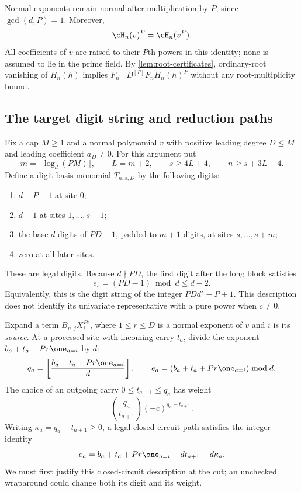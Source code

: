 Normal exponents remain normal after multiplication by $P$,
since $\gcd(d,P)=1$. Moreover,
\begin{equation}
 \cH_n(v)^P=\cH_n(v^P).
 \label{eq:frobenius-trace}
\end{equation}
All coefficients of $v$ are raised to their $P$th powers in
this identity; none is assumed to lie in the prime field.
By \cref{lem:root-certificates}, ordinary-root vanishing of
$H_n(h)$ implies
$F_n\mid D^{[P]}F_nH_n(h)^P$ without any root-multiplicity bound.

\subsection{The target digit string and reduction paths}

Fix a cap $M\ge1$ and a normal polynomial $v$ with positive
leading degree $D\le M$ and leading coefficient $a_D\ne0$.
For this argument put
\begin{equation}
 m=\lfloor\log_d(PM)\rfloor,\qquad L=m+2,
 \qquad s\ge4L+4,\qquad n\ge s+3L+4.
 \label{eq:hasse-spacing}
\end{equation}
Define a digit-basis monomial $T_{n,s,D}$ by the following digits:
\begin{enumerate}[label=\textup{(\alph*)}]
 \item $d-P+1$ at site $0$;
 \item $d-1$ at sites $1,\ldots,s-1$;
 \item the base-$d$ digits of $PD-1$, padded to $m+1$ digits,
       at sites $s,\ldots,s+m$;
 \item zero at all later sites.
\end{enumerate}
These are legal digits. Because $d\nmid PD$, the first digit
after the long block satisfies
\begin{equation}
 e_s=(PD-1)\bmod d\le d-2.
 \label{eq:first-small-digit}
\end{equation}
Equivalently, this is the digit string of the integer
$PDd^s-P+1$. This description does not identify its univariate
representative with a pure power when $c\ne0$.

Expand a term $B_{n,j}X_i^{Pr}$, where $1\le r\le D$ is
a normal exponent of $v$ and $i$ is its \emph{source}. At a
processed site with incoming carry $t_a$, divide the exponent
$b_a+t_a+Pr\one_{a=i}$ by $d$:
\[
 q_a=\left\lfloor\frac{b_a+t_a+Pr\one_{a=i}}d\right\rfloor,
 \qquad e_a=(b_a+t_a+Pr\one_{a=i})\bmod d.
\]
The choice of an outgoing carry $0\le t_{a+1}\le q_a$ has weight
\begin{equation}
 \binom{q_a}{t_{a+1}}(-c)^{q_a-t_{a+1}}.
 \label{eq:marked-weight}
\end{equation}
Writing $\kappa_a=q_a-t_{a+1}\ge0$, a legal closed-circuit
path satisfies the integer identity
\begin{equation}
 e_a=b_a+t_a+Pr\one_{a=i}-dt_{a+1}-d\kappa_a.
 \label{eq:marked-conservation}
\end{equation}
We must first justify this closed-circuit description at the cut;
an unchecked wraparound could change both its digit and its weight.

